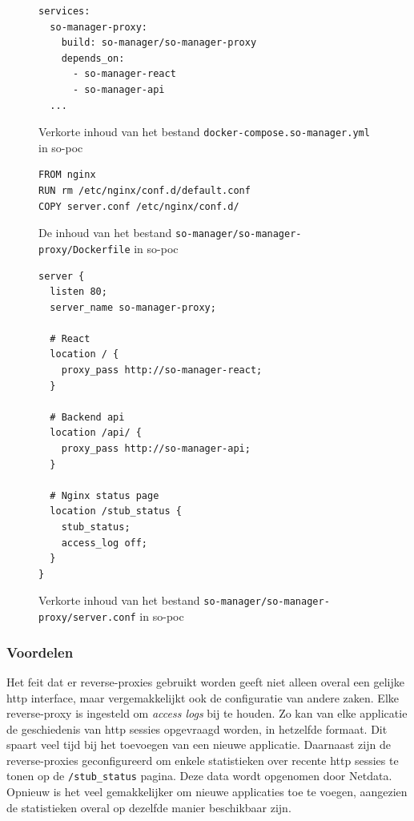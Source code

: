 \documentclass[a4paper,12pt]{report}
\begin{document}
\begin{figure}[H]
  \begin{lstlisting}
services:
  so-manager-proxy:
    build: so-manager/so-manager-proxy
    depends_on:
      - so-manager-react
      - so-manager-api
  ...
  \end{lstlisting}
  \caption{Verkorte inhoud van het bestand \lstinline|docker-compose.so-manager.yml| in so-poc}
  \label{fig:proxy-voorbeeld-compose}
\end{figure}

\begin{figure}[H]
  \begin{lstlisting}
FROM nginx
RUN rm /etc/nginx/conf.d/default.conf
COPY server.conf /etc/nginx/conf.d/
  \end{lstlisting}
  \caption{De inhoud van het bestand \lstinline|so-manager/so-manager-proxy/Dockerfile| in so-poc}
  \label{fig:proxy-voorbeeld-dockerfile}
\end{figure}

\begin{figure}[H]
  \begin{lstlisting}
server {
  listen 80;
  server_name so-manager-proxy;

  # React
  location / {
    proxy_pass http://so-manager-react;
  }

  # Backend api
  location /api/ {
    proxy_pass http://so-manager-api;
  }

  # Nginx status page
  location /stub_status {
    stub_status;
    access_log off;
  }
}
  \end{lstlisting}
  \caption{Verkorte inhoud van het bestand \lstinline|so-manager/so-manager-proxy/server.conf| in so-poc}
  \label{fig:proxy-voorbeeld-server-conf}
\end{figure}


\subsubsection{Voordelen}
Het feit dat er reverse-proxies gebruikt worden geeft niet alleen overal een gelijke http interface, maar vergemakkelijkt ook de configuratie van andere zaken.
Elke reverse-proxy is ingesteld om \emph{access logs} bij te houden.
Zo kan van elke applicatie de geschiedenis van http sessies opgevraagd worden, in hetzelfde formaat.
Dit spaart veel tijd bij het toevoegen van een nieuwe applicatie.
Daarnaast zijn de reverse-proxies geconfigureerd om enkele statistieken over recente http sessies te tonen op de \lstinline|/stub_status| pagina.
Deze data wordt opgenomen door Netdata.
Opnieuw is het veel gemakkelijker om nieuwe applicaties toe te voegen, aangezien de statistieken overal op dezelfde manier beschikbaar zijn.
\end{document}
